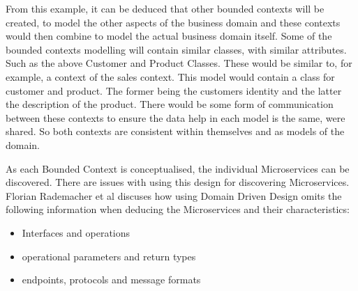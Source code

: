 From this example, it can be deduced that other bounded contexts will be created, to model the other aspects of the business domain and these contexts would then combine to model the actual business domain itself. Some of the bounded contexts modelling will contain similar classes, with similar attributes. Such as the above Customer and Product Classes. These would be similar to, for example, a context of the sales context. This model would contain a class for customer and product. The former being the customers identity and the latter the description of the product. There would be some form of communication between these contexts to ensure the data help in each model is the same, were shared. So both contexts are consistent within themselves and as models of the domain.

As each Bounded Context is conceptualised, the individual Microservices can be discovered. There are issues with using this design for discovering Microservices. Florian Rademacher et al\cite{DDDChallenges} discuses how using Domain Driven Design omits the following information when deducing the Microservices and their characteristics:
\begin{itemize}
	\item Interfaces and operations
	\item operational parameters and return types
	\item endpoints, protocols and message formats
\end{itemize}